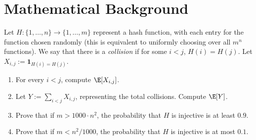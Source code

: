 \section{Mathematical Background}

\setcounter{exercisenum}{4}

\begin{exercisenum}
    Let \( H : \{1, \ldots, n\} \to \{1, \ldots, m\} \) represent a hash function, with each entry for the function chosen randomly (this is equivalent to uniformly choosing over all \( m^n \) functions). We say that there is a \textit{collision} if for some \( i < j \), \( H(i) = H(j) \). Let \( X_{i,j} := \mathbf{1}_{H(i) = H(j)} \).
    \begin{enumerate}
        \item For every \( i < j \), compute \( \E [X_{i,j}] \).
        \item Let \( Y := \sum_{i<j} X_{i,j} \), representing the total collisions. Compute \( \E [Y] \).
        \item Prove that if \( m > 1000 \cdot n^2 \), the probability that \( H \) is injective is at least \( 0.9 \).
        \item Prove that if \( m < n^2 / 1000 \), the probability that \( H \) is injective is at most \( 0.1 \).
    \end{enumerate}
\end{exercisenum}

